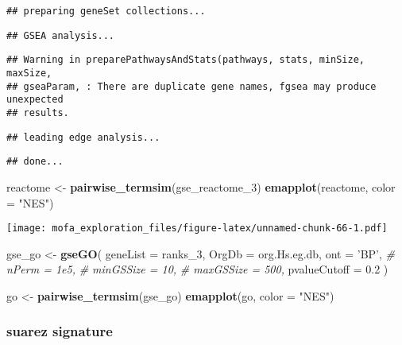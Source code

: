 \documentclass[
]{article}
\newenvironment{Shaded}{\begin{snugshade}}{\end{snugshade}}
\newcommand{\CommentTok}[1]{\textcolor[rgb]{0.56,0.35,0.01}{\textit{#1}}}
\newcommand{\DataTypeTok}[1]{\textcolor[rgb]{0.13,0.29,0.53}{#1}}
\newcommand{\DecValTok}[1]{\textcolor[rgb]{0.00,0.00,0.81}{#1}}
\newcommand{\FloatTok}[1]{\textcolor[rgb]{0.00,0.00,0.81}{#1}}
\newcommand{\KeywordTok}[1]{\textcolor[rgb]{0.13,0.29,0.53}{\textbf{#1}}}
\newcommand{\NormalTok}[1]{#1}
\newcommand{\StringTok}[1]{\textcolor[rgb]{0.31,0.60,0.02}{#1}}
\begin{document}
\begin{verbatim}
## preparing geneSet collections...
\end{verbatim}

\begin{verbatim}
## GSEA analysis...
\end{verbatim}

\begin{verbatim}
## Warning in preparePathwaysAndStats(pathways, stats, minSize, maxSize,
## gseaParam, : There are duplicate gene names, fgsea may produce unexpected
## results.
\end{verbatim}

\begin{verbatim}
## leading edge analysis...
\end{verbatim}

\begin{verbatim}
## done...
\end{verbatim}

\begin{Shaded}
\begin{Highlighting}[]
\NormalTok{reactome <-}\StringTok{ }\KeywordTok{pairwise_termsim}\NormalTok{(gse_reactome_}\DecValTok{3}\NormalTok{) }
\KeywordTok{emapplot}\NormalTok{(reactome, }\DataTypeTok{color =} \StringTok{"NES"}\NormalTok{)}
\end{Highlighting}
\end{Shaded}

\texttt{[image: mofa\_exploration\_files/figure-latex/unnamed-chunk-66-1.pdf]}

\begin{Shaded}
\begin{Highlighting}[]
\NormalTok{gse_go <-}\StringTok{ }\KeywordTok{gseGO}\NormalTok{(}
  \DataTypeTok{geneList =}\NormalTok{ ranks_}\DecValTok{3}\NormalTok{,}
  \DataTypeTok{OrgDb =}\NormalTok{ org.Hs.eg.db,}
  \DataTypeTok{ont =} \StringTok{'BP'}\NormalTok{,}
  \CommentTok{# nPerm = 1e5,}
  \CommentTok{# minGSSize = 10,}
  \CommentTok{# maxGSSize = 500,}
  \DataTypeTok{pvalueCutoff =} \FloatTok{0.2}
\NormalTok{)}

\NormalTok{go <-}\StringTok{ }\KeywordTok{pairwise_termsim}\NormalTok{(gse_go) }
\KeywordTok{emapplot}\NormalTok{(go, }\DataTypeTok{color =} \StringTok{"NES"}\NormalTok{)}
\end{Highlighting}
\end{Shaded}

\hypertarget{suarez-signature-2}{%
\subsubsection{suarez signature}\label{suarez-signature-2}}
\end{document}
